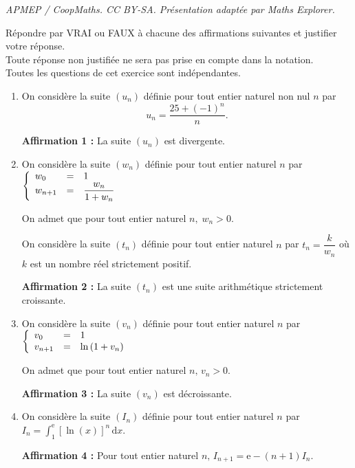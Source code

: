 \documentclass[10pt]{article}
\providecommand{\e}{{\mathrm{e}}}
\begin{document}
\noindent\textit{APMEP / CoopMaths. CC BY-SA. Présentation adaptée par Maths Explorer.}\par\medskip
\medskip

Répondre par VRAI ou FAUX à chacune des affirmations suivantes et justifier votre réponse.\\ Toute réponse non justifiée ne sera pas prise en compte dans la notation.\\
Toutes les questions de cet exercice sont indépendantes.

\medskip

\begin{enumerate}
\item On considère la suite $(u_n)$ définie pour tout entier naturel non nul $n$ par 
\[u_n = \dfrac{25 + (- 1)^n}{n}.\]

\textbf{Affirmation 1 :} La suite $(u_n)$ est divergente.
\item On considère la suite $(w_n)$ définie pour tout entier naturel $n$ par $\left\{\begin{array}{l c l}
w_0&=&1\\w_{n+1}&=&\dfrac{w_n}{1 + w_n}
\end{array}\right.$

On admet que pour tout entier naturel $n,\; w_n > 0$.

On considère la suite $(t_n)$ définie pour tout entier naturel $n$ par $t_n =\dfrac{k}{w_n}$ où $k$ est un nombre réel strictement positif.

\textbf{Affirmation 2 :} La suite $(t_n)$ est une suite arithmétique strictement croissante.

\item On considère la suite $(v_n)$ définie pour tout entier naturel $n$ par $\left\{\begin{array}{l c l}v_0&=&1\\
v_{n+1}&=&\ln \left(1 +  v_n\right)
\end{array}\right.$

On admet que pour tout entier naturel $n,\, v_n > 0$.

\textbf{Affirmation 3 :} La suite $(v_n)$ est décroissante.
\item On considère la suite $(I_n)$ définie pour tout entier naturel $n$ par $I_n = \displaystyle\int_1^{\text{e}} [\ln (x)]^n\,\text{d}x$.

\textbf{Affirmation 4 :} Pour tout entier naturel $n,\, I_{n+1} = \e - (n + 1) I_n$.
\end{enumerate}

\bigskip
\end{document}
